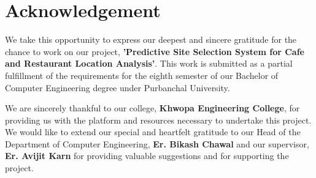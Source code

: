 

\large
\chapter*{Acknowledgement}
\normalsize
{}
We take this opportunity to express our deepest and sincere gratitude for the chance to work on our project, \textbf{'Predictive Site Selection System for Cafe and Restaurant Location Analysis'}. This work is submitted as a partial fulfillment of the requirements for the eighth semester of our Bachelor of Computer Engineering degree under Purbanchal University.

\noindent
We are sincerely thankful to our college, \textbf{Khwopa Engineering College}, for providing us with the platform and resources necessary to undertake this project. We would like to extend our special and heartfelt gratitude to our Head of the Department of Computer
Engineering, \textbf{Er. Bikash Chawal} and our supervisor, \textbf{Er. Avijit Karn} for providing valuable suggestions and for supporting the project.


